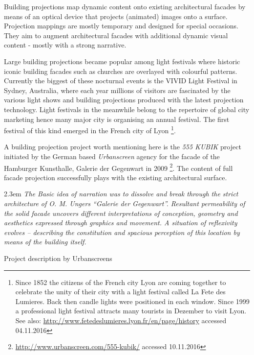 Building projections map dynamic content onto existing architectural facades by means of an optical device that projects (animated) images onto a surface. Projection mappings are mostly temporary and designed for special occasions. They aim to augment architectural facades with additional dynamic visual content - mostly with a strong narrative.  

Large building projections became popular among light festivals where historic iconic building facades such as churches are overlayed with colourful patterns. Currently the biggest of these nocturnal events is the VIVID Light Festival in Sydney, Australia, where each year millions of visitors are fascinated by the various light shows and building projections produced with the latest projection technology. Light festivals in the meanwhile belong to the repertoire of global city marketing hence many major city is organising an annual festival. The first festival of this kind emerged in the French city of Lyon \footnote{Since 1852 the citizens of the French city Lyon are coming together to celebrate the unity of their city with a light festival called La Fete des Lumieres. Back then candle lights were positioned in each window. Since 1999 a professional light festival attracts many tourists in Dezember to visit Lyon. See also: \url{http://www.fetedeslumieres.lyon.fr/en/page/history} accessed 04.11.2016}.    

A building projection project worth mentioning here is the \textit{555 KUBIK}  project initiated by the German based \textit{Urbanscreen} agency for the facade of the Hamburger Kunsthalle, Galerie der Gegenwart in 2009 \footnote{\url{http://www.urbanscreen.com/555-kubik/} accessed 10.11.2016}. The content of full facade projection successfully plays with the existing architectural surface.  


\begin{singlespace}
	\leftskip2.3em
		\rightskip\leftskip
\textit{\small The Basic idea of narration was to dissolve and break through the strict architecture of O. M. Ungers “Galerie der Gegenwart”.
Resultant permeability of the solid facade uncovers different interpretations of conception, geometry and aesthetics expressed through graphics and movement. A situation of reflexivity evolves – describing the constitution and spacious perception of this location by means of the building itself.} 

\small Project description by Urbanscreens
\end{singlespace}

